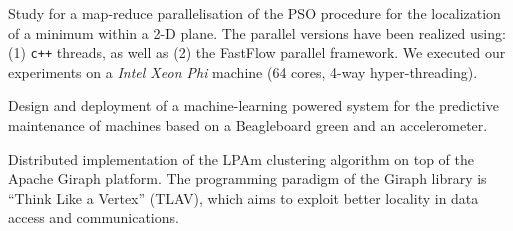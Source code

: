 Study for a map-reduce parallelisation of the PSO procedure for the localization of a minimum within a 2-D plane. The parallel versions have been realized using: (1) \texttt{c++} threads, as well as (2) the FastFlow parallel framework. We executed our experiments on a {\em Intel Xeon Phi} machine (64 cores, 4-way hyper-threading).

\divider


Design and deployment of a machine-learning powered system for the predictive maintenance of machines based on a Beagleboard green and an accelerometer.

\divider


Distributed implementation of the LPAm clustering algorithm on top of the Apache Giraph platform. The programming paradigm of the Giraph library is ``Think Like a Vertex'' (TLAV), which aims to exploit better locality in data access and communications.

